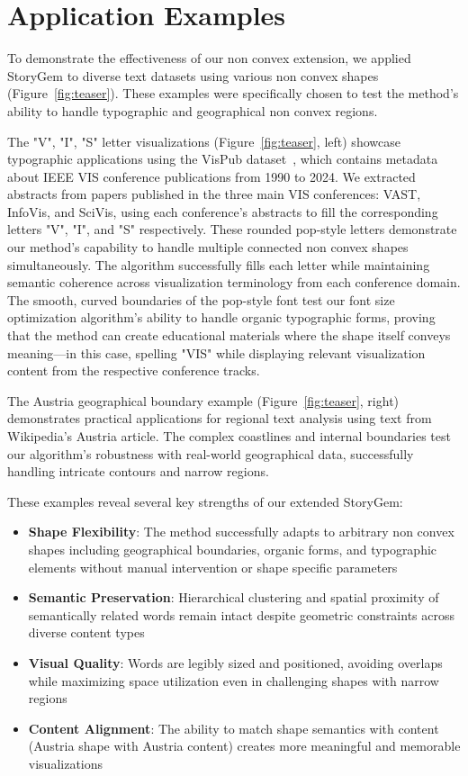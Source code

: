 \documentclass{vgtc}                          %
\begin{document}
\section{Application Examples}

To demonstrate the effectiveness of our non convex extension, we applied StoryGem to diverse text datasets using various non convex shapes (Figure~\ref{fig:teaser}).
These examples were specifically chosen to test the method's ability to handle typographic and geographical non convex regions.

The "V", "I", "S" letter visualizations (Figure~\ref{fig:teaser}, left) showcase typographic applications using the VisPub dataset~\cite{Isenberg:2017:VMC}, which contains metadata about IEEE VIS conference publications from 1990 to 2024.
We extracted abstracts from papers published in the three main VIS conferences: VAST, InfoVis, and SciVis, using each conference's abstracts to fill the corresponding letters "V", "I", and "S" respectively.
These rounded pop-style letters demonstrate our method's capability to handle multiple connected non convex shapes simultaneously.
The algorithm successfully fills each letter while maintaining semantic coherence across visualization terminology from each conference domain.
The smooth, curved boundaries of the pop-style font test our font size optimization algorithm's ability to handle organic typographic forms, proving that the method can create educational materials where the shape itself conveys meaning—in this case, spelling "VIS" while displaying relevant visualization content from the respective conference tracks.

The Austria geographical boundary example (Figure~\ref{fig:teaser}, right) demonstrates practical applications for regional text analysis using text from Wikipedia's Austria article.
The complex coastlines and internal boundaries test our algorithm's robustness with real-world geographical data, successfully handling intricate contours and narrow regions.

These examples reveal several key strengths of our extended StoryGem:
\begin{itemize}
  \item \textbf{Shape Flexibility}: The method successfully adapts to arbitrary non convex shapes including geographical boundaries, organic forms, and typographic elements without manual intervention or shape specific parameters
  \item \textbf{Semantic Preservation}: Hierarchical clustering and spatial proximity of semantically related words remain intact despite geometric constraints across diverse content types
  \item \textbf{Visual Quality}: Words are legibly sized and positioned, avoiding overlaps while maximizing space utilization even in challenging shapes with narrow regions
  \item \textbf{Content Alignment}: The ability to match shape semantics with content (Austria shape with Austria content) creates more meaningful and memorable visualizations
\end{itemize}
\end{document}
